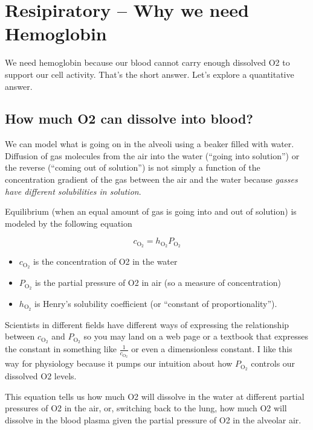 \documentclass[]{book}
\providecommand{\tightlist}{%
  \setlength{\itemsep}{0pt}\setlength{\parskip}{0pt}}
\begin{document}
\chapter{Resipiratory -- Why we need
Hemoglobin}\label{resipiratory-why-we-need-hemoglobin}

We need hemoglobin because our blood cannot carry enough dissolved O2 to
support our cell activity. That's the short answer. Let's explore a
quantitative answer.

\section{How much O2 can dissolve into
blood?}\label{how-much-o2-can-dissolve-into-blood}

We can model what is going on in the alveoli using a beaker filled with
water. Diffusion of gas molecules from the air into the water (``going
into solution'') or the reverse (``coming out of solution'') is not
simply a function of the concentration gradient of the gas between the
air and the water because \emph{gasses have different solubilities in
solution}.

Equilibrium (when an equal amount of gas is going into and out of
solution) is modeled by the following equation

\begin{equation}
c_\mathrm{O_2} = h_\mathrm{O_2} P_\mathrm{O_2}
\end{equation}

\begin{itemize}
\tightlist
\item
  \(c_\mathrm{O_2}\) is the concentration of O2 in the water
\item
  \(P_\mathrm{O_2}\) is the partial pressure of O2 in air (so a measure
  of concentration)
\item
  \(h_\mathrm{O_2}\) is Henry's solubility coefficient (or ``constant of
  proportionality'').
\end{itemize}

Scientists in different fields have different ways of expressing the
relationship between \(c_\mathrm{O_2}\) and \(P_\mathrm{O_2}\) so you
may land on a web page or a textbook that expresses the constant in
something like \(\frac{1}{c_\mathrm{O_2}}\) or even a dimensionless
constant. I like this way for physiology because it pumps our intuition
about how \(P_\mathrm{O_2}\) controls our dissolved O2 levels.

This equation tells us how much O2 will dissolve in the water at
different partial pressures of O2 in the air, or, switching back to the
lung, how much O2 will dissolve in the blood plasma given the partial
pressure of O2 in the alveolar air.
\end{document}
